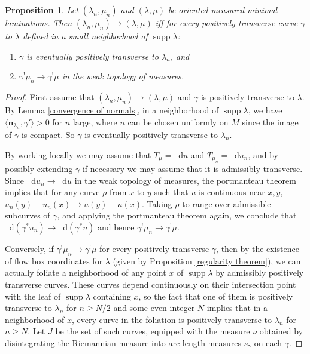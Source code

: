 \documentclass[final,12pt, leqno]{brownthesis}
\DeclareMathOperator{\supp}{supp}
\newcommand*\dif{\mathop{}\!\mathrm{d}}
\newcommand{\normal}{\mathbf n}
\newtheorem{proposition}[theorem]{Proposition}
\theoremstyle{definition}
\numberwithin{equation}{section}
\begin{document}
\begin{proposition}\label{characterization of measure convergence}
	Let $(\lambda_n, \mu_n)$ and $(\lambda, \mu)$ be oriented measured minimal laminations. Then $(\lambda_n, \mu_n) \to (\lambda, \mu)$ iff for every positively transverse curve $\gamma$ to $\lambda$ defined in a small neighborhood of $\supp \lambda$:
\begin{enumerate}
\item $\gamma$ is eventually positively transverse to $\lambda_n$, and 
\item $\gamma^! \mu_n \to \gamma^! \mu$ in the weak topology of measures.
\end{enumerate}
\end{proposition}
\begin{proof}
	First assume that $(\lambda_n, \mu_n) \to (\lambda, \mu)$ and $\gamma$ is positively transverse to $\lambda$.
	By Lemma \ref{convergence of normals}, in a neighborhood of $\supp \lambda$, we have $\langle \normal_{\lambda_n}, \gamma' \rangle > 0$ for $n$ large, where $n$ can be chosen uniformly on $M$ since the image of $\gamma$ is compact. So $\gamma$ is eventually positively transverse to $\lambda_n$.

	By working locally we may assume that $T_\mu = \dif u$ and $T_{\mu_n} = \dif u_n$, and by possibly extending $\gamma$ if necessary we may assume that it is admissibly transverse.
	Since $\dif u_n \to \dif u$ in the weak topology of measures, the portmanteau theorem implies that for any curve $\rho$ from $x$ to $y$ such that $u$ is continuous near $x, y$, $u_n(y) - u_n(x) \to u(y) - u(x)$.
	Taking $\rho$ to range over admissible subcurves of $\gamma$, and applying the portmanteau theorem again, we conclude that $\dif(\gamma^* u_n) \to \dif(\gamma^* u)$ and hence $\gamma^! \mu_n \to \gamma^! \mu$.

	Conversely, if $\gamma^! \mu_n \to \gamma^! \mu$ for every positively transverse $\gamma$, then by the existence of flow box coordinates for $\lambda$ (given by Proposition \ref{regularity theorem}), we can actually foliate a neighborhood of any point $x$ of $\supp \lambda$ by admissibly positively transverse curves.
	These curves depend continuously on their intersection point with the leaf of $\supp \lambda$ containing $x$, so the fact that one of them is positively transverse to $\lambda_n$ for $n \geq N/2$ and some even integer $N$ implies that in a neighborhood of $x$, every curve in the foliation is positively transverse to $\lambda_n$ for $n \geq N$.
	Let $J$ be the set of such curves, equipped with the measure $\nu$ obtained by disintegrating the Riemannian measure into arc length measures $s_\gamma$ on each $\gamma$.
	

\end{proof}
\end{document}

